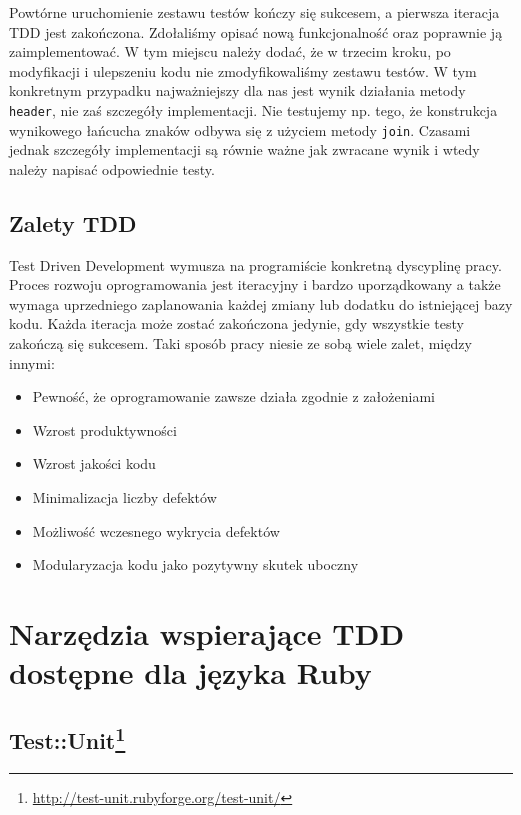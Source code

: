     
    
  Powtórne uruchomienie zestawu testów kończy się sukcesem, a pierwsza iteracja TDD jest zakończona. Zdołaliśmy opisać nową funkcjonalność oraz poprawnie ją zaimplementować. W tym miejscu należy dodać, że w trzecim kroku, po modyfikacji i ulepszeniu kodu nie zmodyfikowaliśmy zestawu testów. W tym konkretnym przypadku najważniejszy dla nas jest wynik działania metody \verb+header+, nie zaś szczegóły implementacji. Nie testujemy np. tego, że konstrukcja wynikowego łańcucha znaków odbywa się z użyciem metody \verb+join+. Czasami jednak szczegóły implementacji są równie ważne jak zwracane wynik i wtedy należy napisać odpowiednie testy.
    
  \subsection{Zalety TDD}
    Test Driven Development wymusza na programiście konkretną dyscyplinę pracy. Proces rozwoju oprogramowania jest iteracyjny i bardzo uporządkowany a także wymaga uprzedniego zaplanowania każdej zmiany lub dodatku do istniejącej bazy kodu. Każda iteracja może zostać zakończona jedynie, gdy wszystkie testy zakończą się sukcesem. Taki sposób pracy niesie ze sobą wiele zalet, między innymi:
     
    \begin{itemize}
      \item Pewność, że oprogramowanie zawsze działa zgodnie z założeniami
      \item Wzrost produktywności
      \item Wzrost jakości kodu
      \item Minimalizacja liczby defektów
      \item Możliwość wczesnego wykrycia defektów
      \item Modularyzacja kodu jako pozytywny skutek uboczny
    \end{itemize}

  \section{Narzędzia wspierające TDD dostępne dla języka Ruby}
    
    \subsection[Test::Unit]{Test::Unit\footnote{\url{http://test-unit.rubyforge.org/test-unit/}\nocite{test_unit}}}
    
